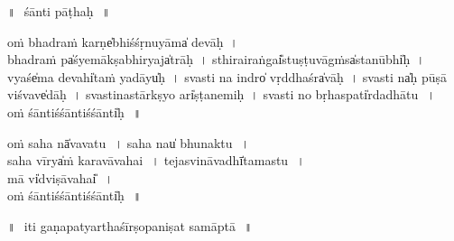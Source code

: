\documentclass[parskip, DIV=14]{scrartcl}
\begin{document}
\vspace{1cm}

॥\,~śānti pāṭhaḥ\,~॥ \\

\vspace{0.5cm}


oṁ bha॒draṁ karṇe̍bhiśśṛnu॒yāma̍ devāḥ~।\\
 bha॒draṁ pa̍śyemā॒kṣabhi॒ryaja̍trāḥ~। sthi॒rairaṅgai̎stuṣṭu॒vāgṁsa̍sta॒nūbhi̍ḥ~। vyaśe̍ma de॒vahi̍ta॒ṁ yadāyu̍ḥ~।
sva॒sti na॒ indro̍ vṛ॒ddhaśra̍vāḥ~। sva॒sti na̍ḥ pū॒ṣā vi॒śvave̍dāḥ~। sva॒stina॒stārkṣyo॒ ari̍ṣṭanemiḥ~। sva॒sti no॒ bṛha॒spati̍rdadhātu\,~।\\
 oṁ śānti॒śśānti॒śśānti̍ḥ\,~॥ 

\vspace{0.6cm}

oṁ sa॒ha nā̍vavatu\,~।
sa॒ha nau̍ bhunaktu\,~।\\
sa॒ha vī॒rya̍ṁ karavāvahai\,~।
te॒ja॒svinā॒vadhī̍tamastu॒\,~।\\
mā vi̍dviṣā॒vahai̎\,~।\\
oṁ śānti॒śśānti॒śśānti̍ḥ\,~॥

\vspace{1cm}
॥\,~iti ga॒ṇapatyarthaśīrṣopaniṣat samā॒ptā\,~॥ \\
\end{document}
